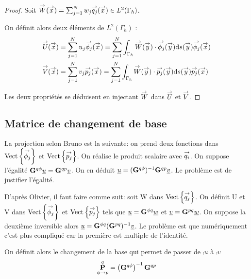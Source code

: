     \begin{proof}
      Soit  \(\vect{W}(\vx) = \sum_{j=1}^N w_j \qj(\vx) \in L^2(\Gamma_h)\).

      On définit alors deux éléments de \(L^2(\Gamma_h)\) :
      \begin{align}
        \vect{U}(\vx) &= \sum_{j=1}^N u_j \phij(\vx) = \sum_{j=1}^N \int_{\Gamma_h}\vect{W}(\vy)\cdot\phij(\vy)\dd{s}(\vy) \phij(\vx  )
        \\
        \vect{V}(\vx) &= \sum_{j=1}^N v_j \pj(\vx) = \sum_{j=1}^N \int_{\Gamma_h}\vect{W}(\vy)\cdot\pj(\vy)\dd{s}(\vy) \pj(\vx)
      \end{align}

      Les deux propriétés se déduisent en injectant \(\vect{W}\) dans \(\vect{U}\) et \(\vect{V}\).
    \end{proof}




  \subsection{Matrice de changement de base}

    \begin{TODO}
      La projection selon Bruno est la suivante: on prend deux fonctions dans \(\Vect{\phij}\) et \(\Vect{\pj}\). On réalise le produit scalaire avec \(\vect{q_i}\). On suppose l'égalité \(\mG{q}{\phi}\comp{u} = \mG{q}{p}\comp{v}\). On en déduit \(\comp{u} = (\mG{q}{\phi})^{-1} \mG{q}{p} \comp{v} \). Le problème est de justifier l'égalité.

      D'après Olivier, il faut faire comme suit: soit W dans \(\Vect{\qj}\).
      On définit U et V dans \(\Vect{\phij}\) et \(\Vect{\pj}\) tels que \(\comp{u}=\mG{\phi}{q}\comp{w}\) et  \(\comp{v}=\mG{p}{q}\comp{w}\).
      On suppose la deuxième inversible alors  \(\comp{u} =\mG{\phi}{q} (\mG{p}{q})^{-1} \comp{v} \). Le problème est que numériquement c'est plus compliqué car la première est multiple de l'identité.



    \end{TODO}

    \begin{defn}
      On définit alors le changement de la base qui permet de passer de \(\comp{u}\) à \(\comp{v}\)
      \begin{equation*}
        \mP{\phi}{p}{q} = \left(\mG{q}{\phi}\right)^{-1}\mG{q}{p}
      \end{equation*}
    \end{defn}

